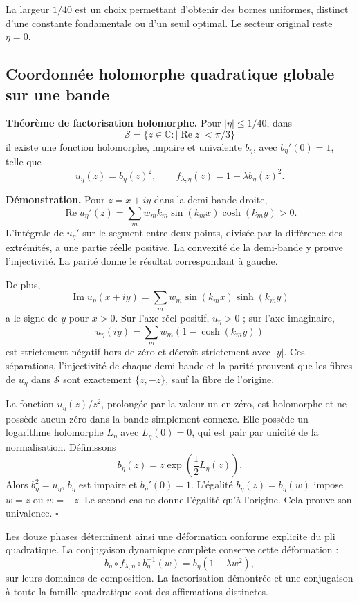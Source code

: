 La largeur \(1/40\) est un choix permettant d’obtenir des bornes uniformes, distinct d’une constante fondamentale ou d’un seuil optimal. Le secteur original reste \(\eta=0\).


\subsection{Coordonnée holomorphe quadratique globale sur une bande}
\label{hmtfg:desarrollo:4}

\textbf{Théorème de factorisation holomorphe.} Pour \(|\eta|\le1/40\), dans
\[
\mathcal S=\{z\in\mathbb C:|\operatorname{Re}z|<\pi/3\}
\]
il existe une fonction holomorphe, impaire et univalente \(b_\eta\), avec \(b_\eta'(0)=1\), telle que
\[
\boxed{u_\eta(z)=b_\eta(z)^2,\qquad
f_{\lambda,\eta}(z)=1-\lambda b_\eta(z)^2.}
\]

\textbf{Démonstration.} Pour \(z=x+iy\) dans la demi-bande droite,
\[
\operatorname{Re}u_\eta'(z)
=\sum_mw_mk_m\sin(k_mx)\cosh(k_my)>0.
\]
L’intégrale de \(u_\eta'\) sur le segment entre deux points, divisée par la différence des extrémités, a une partie réelle positive. La convexité de la demi-bande y prouve l’injectivité. La parité donne le résultat correspondant à gauche.

De plus,
\[
\operatorname{Im}u_\eta(x+iy)
=\sum_mw_m\sin(k_mx)\sinh(k_my)
\]
a le signe de \(y\) pour \(x>0\). Sur l’axe réel positif, \(u_\eta>0\) ; sur l’axe imaginaire,
\[
u_\eta(iy)=\sum_mw_m(1-\cosh(k_my))
\]
est strictement négatif hors de zéro et décroît strictement avec \(|y|\). Ces séparations, l’injectivité de chaque demi-bande et la parité prouvent que les fibres de \(u_\eta\) dans \(\mathcal S\) sont exactement \(\{z,-z\}\), sauf la fibre de l’origine.

La fonction \(u_\eta(z)/z^2\), prolongée par la valeur un en zéro, est holomorphe et ne possède aucun zéro dans la bande simplement connexe. Elle possède un logarithme holomorphe \(L_\eta\) avec \(L_\eta(0)=0\), qui est pair par unicité de la normalisation. Définissons
\[
b_\eta(z)=z\exp\!\left(\frac12L_\eta(z)\right).
\]
Alors \(b_\eta^2=u_\eta\), \(b_\eta\) est impaire et \(b_\eta'(0)=1\). L’égalité \(b_\eta(z)=b_\eta(w)\) impose \(w=z\) ou \(w=-z\). Le second cas ne donne l’égalité qu’à l’origine. Cela prouve son univalence. \(\square\)

Les douze phases déterminent ainsi une déformation conforme explicite du pli quadratique. La conjugaison dynamique complète conserve cette déformation :
\[
b_\eta\circ f_{\lambda,\eta}\circ b_\eta^{-1}(w)
=b_\eta(1-\lambda w^2),
\]
sur leurs domaines de composition. La factorisation démontrée et une conjugaison à toute la famille quadratique sont des affirmations distinctes.


